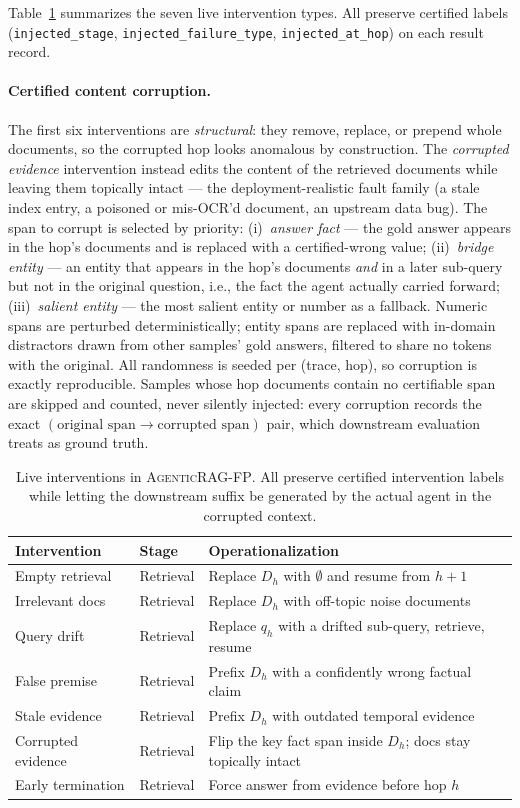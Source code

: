 \documentclass[11pt]{article}
\newcommand{\ours}{\textnormal{\textsc{AgenticRAG-FP}}}
\begin{document}
Table~\ref{tab:interventions} summarizes the seven live intervention types.  All
preserve certified labels (\texttt{injected\_stage},
\texttt{injected\_failure\_type}, \texttt{injected\_at\_hop}) on each result
record.

\paragraph{Certified content corruption.}
The first six interventions are \emph{structural}: they remove, replace, or
prepend whole documents, so the corrupted hop looks anomalous by construction.
The \emph{corrupted evidence} intervention instead edits the content of the
retrieved documents while leaving them topically intact --- the
deployment-realistic fault family (a stale index entry, a poisoned or mis-OCR'd
document, an upstream data bug).  The span to corrupt is selected by priority:
(i)~\emph{answer fact} --- the gold answer appears in the hop's documents and is
replaced with a certified-wrong value; (ii)~\emph{bridge entity} --- an entity
that appears in the hop's documents \emph{and} in a later sub-query but not in
the original question, i.e., the fact the agent actually carried forward;
(iii)~\emph{salient entity} --- the most salient entity or number as a fallback.
Numeric spans are perturbed deterministically; entity spans are replaced with
in-domain distractors drawn from other samples' gold answers, filtered to share
no tokens with the original.  All randomness is seeded per (trace, hop), so
corruption is exactly reproducible.  Samples whose hop documents contain no
certifiable span are skipped and counted, never silently injected: every
corruption records the exact $(\text{original span} \rightarrow
\text{corrupted span})$ pair, which downstream evaluation treats as ground
truth.

\begin{table}[t]
\centering
\small
\begin{tabular}{lll}
\toprule
Intervention & Stage & Operationalization \\
\midrule
Empty retrieval    & Retrieval & Replace $D_h$ with $\emptyset$ and resume from $h{+}1$ \\
Irrelevant docs    & Retrieval & Replace $D_h$ with off-topic noise documents \\
Query drift        & Retrieval & Replace $q_h$ with a drifted sub-query, retrieve, resume \\
False premise      & Retrieval & Prefix $D_h$ with a confidently wrong factual claim \\
Stale evidence     & Retrieval & Prefix $D_h$ with outdated temporal evidence \\
Corrupted evidence & Retrieval & Flip the key fact span inside $D_h$; docs stay topically intact \\
Early termination  & Retrieval & Force answer from evidence before hop $h$ \\
\bottomrule
\end{tabular}
\caption{Live interventions in \ours.  All preserve certified intervention
labels while letting the downstream suffix be generated by the actual agent in
the corrupted context.}
\label{tab:interventions}
\end{table}
\end{document}
